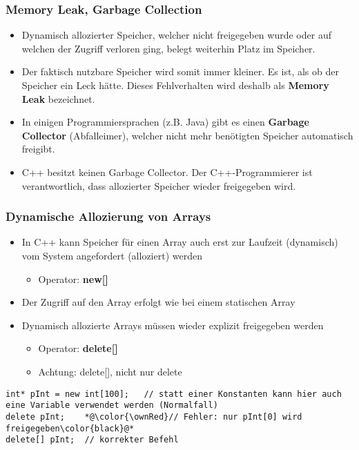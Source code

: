 \subsubsection{Memory Leak, Garbage Collection\hfill}
\label{sec:Memory Leak, Garbage Collection}
\begin{itemize}
	\item Dynamisch allozierter Speicher, welcher nicht freigegeben wurde oder auf welchen der Zugriff verloren ging, belegt weiterhin Platz im Speicher.
	\item Der faktisch nutzbare Speicher wird somit immer kleiner. Es ist, als ob der Speicher ein Leck hätte. Dieses Fehlverhalten wird deshalb als \textbf{Memory Leak} bezeichnet.
	\item In einigen Programmiersprachen (z.B. Java) gibt es einen \textbf{Garbage Collector} (Abfalleimer), welcher nicht mehr benötigten Speicher automatisch freigibt.
	\item C++ besitzt keinen Garbage Collector. Der C++-Programmierer ist verantwortlich, dass allozierter Speicher wieder freigegeben wird.
\end{itemize}

\subsubsection{Dynamische Allozierung von Arrays\hfill}
\label{sec:Dynamische Allozierung von Arrays}
\begin{itemize}
	\item In C++ kann Speicher für einen Array auch erst zur Laufzeit (dynamisch) vom System angefordert (alloziert) werden
	\begin{itemize}
		\item Operator: \textbf{new[]}
	\end{itemize}
	\item Der Zugriff auf den Array erfolgt wie bei einem statischen Array
	\item Dynamisch allozierte Arrays müssen wieder explizit freigegeben werden
	\begin{itemize}
		\item Operator: \textbf{delete[]}
		\item \color{\ownRed}Achtung: delete[], nicht nur delete\color{black}
	\end{itemize}
\end{itemize}
\noindent
\begin{minipage}{\linewidth}
\begin{lstlisting}
int* pInt = new int[100];	// statt einer Konstanten kann hier auch eine Variable verwendet werden (Normalfall)
delete pInt;	*@\color{\ownRed}// Fehler: nur pInt[0] wird freigegeben\color{black}@*
delete[] pInt;	// korrekter Befehl
\end{lstlisting}
\end{minipage} 

